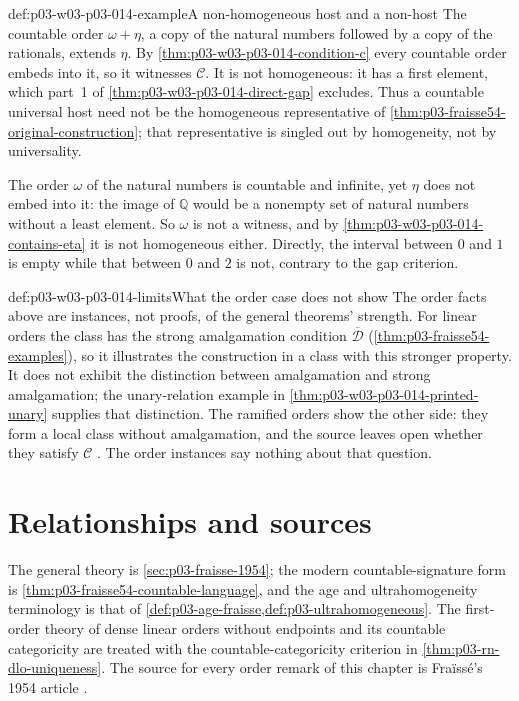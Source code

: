 \begin{hbexample}{def:p03-w03-p03-014-example}{A non-homogeneous host and a non-host}
The countable order \(\omega+\eta\), a copy of the natural numbers
followed by a copy of the rationals, extends \(\eta\). By
\cref{thm:p03-w03-p03-014-condition-c} every countable order embeds
into it, so it witnesses \(\mathcal C\). It is not homogeneous: it has a
first element, which part~1 of \cref{thm:p03-w03-p03-014-direct-gap}
excludes. Thus a countable universal host need not be the homogeneous
representative of \cref{thm:p03-fraisse54-original-construction}; that
representative is singled out by homogeneity, not by universality.

The order \(\omega\) of the natural numbers is countable and infinite,
yet \(\eta\) does not embed into it: the image of \(\mathbb Q\) would be
a nonempty set of natural numbers without a least element. So \(\omega\)
is not a witness, and by \cref{thm:p03-w03-p03-014-contains-eta} it is
not homogeneous either. Directly, the interval between \(0\) and \(1\)
is empty while that between \(0\) and \(2\) is not, contrary to the
gap criterion.
\end{hbexample}

\begin{hbwarning}{def:p03-w03-p03-014-limits}{What the order case does not show}
The order facts above are instances, not proofs, of the general
theorems' strength. For linear orders the class has the strong
amalgamation condition \(\overline{\mathcal D}\)
(\cref{thm:p03-fraisse54-examples}), so it illustrates the construction in a class with this stronger
property. It does not exhibit the distinction between amalgamation and
strong amalgamation; the unary-relation example in
\cref{thm:p03-w03-p03-014-printed-unary} supplies that distinction. The ramified orders show the
other side: they form a local class without amalgamation, and the source
leaves open whether they satisfy \(\mathcal C\)
\cite[\S9.5, p.~387]{Fraisse1954}. The order instances say nothing about
that question.
\end{hbwarning}

\section{Relationships and sources}
\label{sec:p03-w03-p03-014-relations}

The general theory is \cref{sec:p03-fraisse-1954}; the modern
countable-signature form is \cref{thm:p03-fraisse54-countable-language},
and the age and ultrahomogeneity terminology is that of
\cref{def:p03-age-fraisse,def:p03-ultrahomogeneous}.
The first-order theory of dense linear orders without endpoints and its
countable categoricity are treated with the countable-categoricity
criterion in \cref{thm:p03-rn-dlo-uniqueness}. The source for every
order remark of this chapter is Fra\"iss\'e's 1954 article
\cite[\S\S1.1, 1.4, 4.1, 4.7, 5.1, 6.1--6.3, 8.1]{Fraisse1954}.
